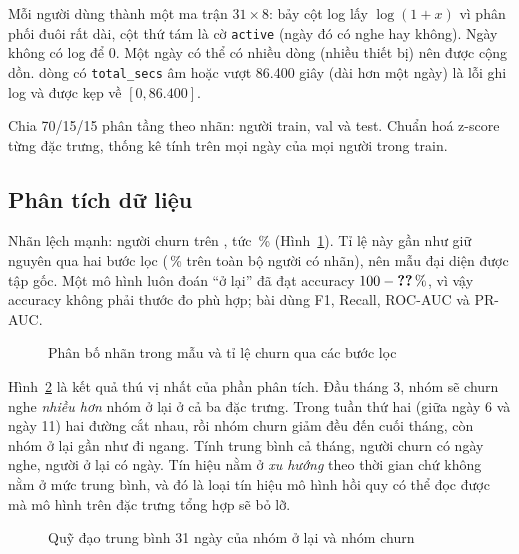 
Mỗi người dùng thành một ma trận $31 \times 8$: bảy cột log lấy $\log(1+x)$ vì phân phối đuôi rất dài, cột thứ tám là
cờ \texttt{active} (ngày đó có nghe hay không). Ngày không có log để 0. Một ngày có thể có nhiều dòng (nhiều thiết bị)
nên được cộng dồn.  dòng có \texttt{total\_secs} âm hoặc vượt 86.400 giây (dài hơn một ngày) là
lỗi ghi log và được kẹp về $[0, 86.400]$.


Chia 70/15/15 phân tầng theo nhãn:  người train,  val và  test.
Chuẩn hoá z-score từng đặc trưng, thống kê tính trên mọi ngày của mọi người trong train.

\subsection{Phân tích dữ liệu}

Nhãn lệch mạnh:  người churn trên , tức \,\%
(Hình~\ref{fig:kklabels}). Tỉ lệ này gần như giữ nguyên qua hai bước lọc (\,\% trên toàn bộ
người có nhãn), nên mẫu đại diện được tập gốc. Một mô hình luôn đoán ``ở lại'' đã đạt accuracy
$100 - \SL{kkbox/churn_rate_sample} \,\%$, vì vậy accuracy không phải thước đo phù hợp; bài dùng F1, Recall, ROC-AUC và
PR-AUC.

\begin{figure}[H]
  \centering
  \caption{Phân bố nhãn trong mẫu và tỉ lệ churn qua các bước lọc}
  \label{fig:kklabels}
\end{figure}

Hình~\ref{fig:kktraj} là kết quả thú vị nhất của phần phân tích. Đầu tháng 3, nhóm sẽ churn nghe \emph{nhiều hơn} nhóm ở
lại ở cả ba đặc trưng. Trong tuần thứ hai (giữa ngày 6 và ngày 11) hai đường cắt nhau, rồi nhóm churn giảm đều đến cuối
tháng, còn nhóm ở lại gần như đi ngang. Tính trung bình cả
tháng, người churn có  ngày nghe, người ở lại có  ngày. Tín hiệu
nằm ở \emph{xu hướng} theo thời gian chứ không nằm ở mức trung bình, và đó là loại tín hiệu mô hình hồi quy có thể đọc
được mà mô hình trên đặc trưng tổng hợp sẽ bỏ lỡ.

\begin{figure}[H]
  \centering
  \caption{Quỹ đạo trung bình 31 ngày của nhóm ở lại và nhóm churn}
  \label{fig:kktraj}
\end{figure}

